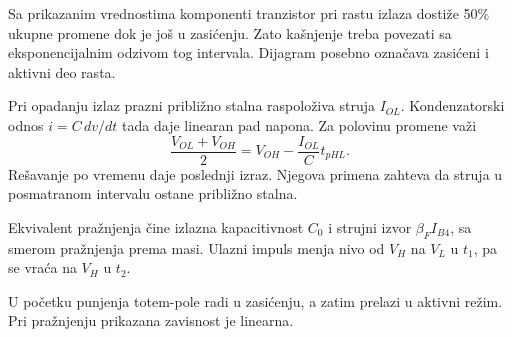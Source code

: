 Sa prikazanim vrednostima komponenti tranzistor pri rastu izlaza dostiže 50\% ukupne promene dok je još u zasićenju. Zato kašnjenje treba povezati sa eksponencijalnim odzivom tog intervala. Dijagram posebno označava zasićeni i aktivni deo rasta.

Pri opadanju izlaz prazni približno stalna raspoloživa struja $I_{OL}$. Kondenzatorski odnos $i=C\,dv/dt$ tada daje linearan pad napona. Za polovinu promene važi
\[\frac{V_{OL}+V_{OH}}2=V_{OH}-\frac{I_{OL}}Ct_{pHL}.\]
Rešavanje po vremenu daje poslednji izraz. Njegova primena zahteva da struja u posmatranom intervalu ostane približno stalna.

Ekvivalent pražnjenja čine izlazna kapacitivnost $C_0$ i strujni izvor $\beta_FI_{B4}$, sa smerom pražnjenja prema masi. Ulazni impuls menja nivo od $V_H$ na $V_L$ u $t_1$, pa se vraća na $V_H$ u $t_2$.

U početku punjenja totem-pole radi u zasićenju, a zatim prelazi u aktivni režim. Pri pražnjenju prikazana zavisnost je linearna.
